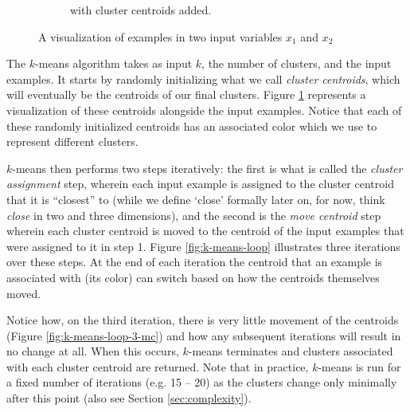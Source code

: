 \begin{figure}
\begin{subfigure}[b]{0.48\textwidth}
         \caption{with cluster centroids added.}
         \label{fig:input-data-b}
     \end{subfigure}
     \hfill
        \caption{A visualization of examples in two input variables $x_1$ and $x_2$}
        \label{fig:input-data}
\end{figure}

The $k$-means algorithm takes as input $k$, the number of clusters, and the input examples. It starts by randomly initializing what we call \emph{cluster centroids}, which will eventually be the centroids of our final clusters. Figure \ref{fig:input-data-b} represents a visualization of these centroids alongside the input examples. Notice that each of these randomly initialized centroids has an associated color which we use to represent different clusters. 

$k$-means then performs two steps iteratively: the first is what is called the \emph{cluster assignment} step, wherein each input example is assigned to the cluster centroid that it is ``closest'' to (while we define `close' formally later on, for now, think \emph{close} in two and three dimensions), and the second is the \emph{move centroid} step wherein each cluster centroid is moved to the centroid of the input examples that were assigned to it in step 1. Figure \ref{fig:k-means-loop} illustrates three iterations over these steps. At the end of each iteration the centroid that an example is associated with (its color) can switch based on how the centroids themselves moved. 

Notice how, on the third iteration, there is very little movement of the centroids (Figure \ref{fig:k-means-loop-3-mc}) and how any subsequent iterations will result in no change at all. When this occurs, $k$-means terminates and clusters associated with each cluster centroid are returned. Note that in practice, $k$-means is run for a fixed number of iterations (e.g. 15 -- 20) as the clusters change only minimally after this point (also see Section \ref{sec:complexity}). 

